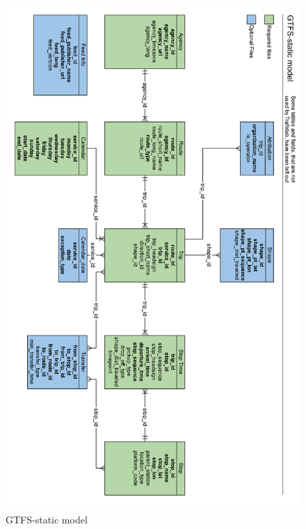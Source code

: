 \documentclass[zavrsnirad]{fer}
\begin{document}
\begin{figure}[H]
	\centering
	\includegraphics[width=\linewidth-30pt]{Figures/gtfs-model.png}
	\caption{GTFS-static model \cite{GTFS-schedule-model}}
	\label{slk:gtfs-model}
\end{figure}

\newpage
\end{document}
